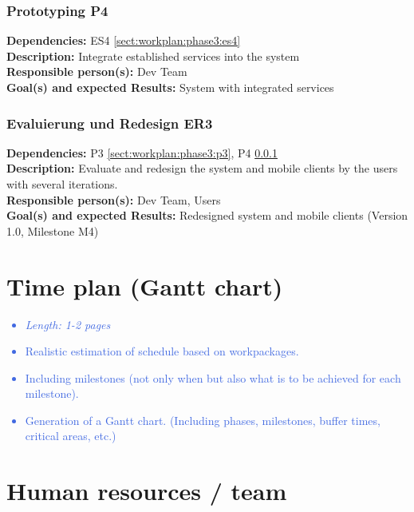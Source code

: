 \documentclass[a4paper,11pt]{article}
\providecommand*{\note}[1]{\small \textcolor{RoyalBlue}{\begin{minipage}{\textwidth}{#1}\end{minipage}}}
\begin{document}
\subsubsection{Prototyping P4}
\label{sect:workplan:phase3:p4}
\textbf{Dependencies:} ES4 \ref{sect:workplan:phase3:es4}\\
\textbf{Description:} Integrate established services into the system\\
\textbf{Responsible person(s):} Dev Team\\
\textbf{Goal(s) and expected Results:} System with integrated services\\

\subsubsection{Evaluierung und Redesign ER3}
\label{sect:workplan:phase3:er3}
\textbf{Dependencies:} P3 \ref{sect:workplan:phase3:p3}, P4 \ref{sect:workplan:phase3:p4}\\
\textbf{Description:} Evaluate and redesign the system and mobile clients by the users with several iterations.\\
\textbf{Responsible person(s):} Dev Team, Users\\
\textbf{Goal(s) and expected Results:} Redesigned system and mobile clients (Version 1.0, Milestone M4)\\


\pagebreak
\section{Time plan (Gantt chart)}
\label{sect:timeplan}

\note{
\begin{itemize}
\item {\em Length: 1-2 pages}
\item Realistic estimation of schedule based on workpackages.
\item Including milestones (not only when but also what is to be achieved for each milestone).
\item Generation of a Gantt chart. (Including phases, milestones, buffer times, critical areas, etc.)
\end{itemize}
}

\section{Human resources / team}
\label{sect:team}
\end{document}

